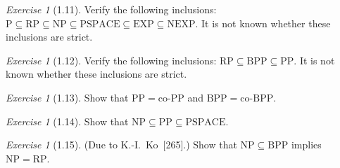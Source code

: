 \documentclass[twoside,12pt]{book}
\theoremstyle{plain}
\theoremstyle{definition}
\theoremstyle{remark}
\newtheorem{exercise}[theorem]{Exercise}
\begin{document}
\begin{exercise}[1.11]
Verify the following inclusions:
$\mathrm{P}\subseteq\mathrm{RP}\subseteq\mathrm{NP}
  \subseteq\mathrm{PSPACE}\subseteq\mathrm{EXP}\subseteq\mathrm{NEXP}$.
It is not known whether these inclusions are strict.
\end{exercise}

\begin{exercise}[1.12]
Verify the following inclusions:
$\mathrm{RP}\subseteq\mathrm{BPP}\subseteq\mathrm{PP}$.
It is not known whether these inclusions are strict.
\end{exercise}

\begin{exercise}[1.13]
Show that $\mathrm{PP}=\mathrm{co\text{-}PP}$ and
$\mathrm{BPP}=\mathrm{co\text{-}BPP}$.
\end{exercise}

\begin{exercise}[1.14]
Show that $\mathrm{NP}\subseteq\mathrm{PP}\subseteq\mathrm{PSPACE}$.
\end{exercise}

\begin{exercise}[1.15]
(Due to K.-I.~Ko~[265].)  Show that $\mathrm{NP}\subseteq\mathrm{BPP}$
implies $\mathrm{NP}=\mathrm{RP}$.
\end{exercise}
\end{document}
